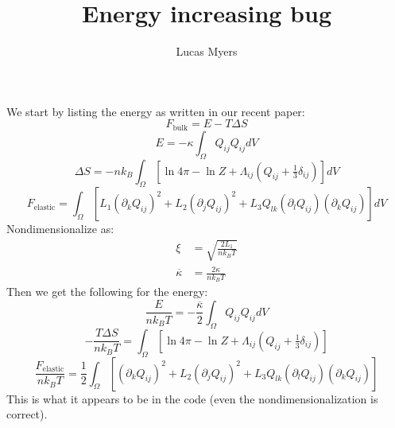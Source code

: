 \documentclass[reqno]{article}
\begin{document}
\title{Energy increasing bug}
\author{Lucas Myers}
\maketitle

We start by listing the energy as written in our recent paper:
\begin{equation}
    F_\text{bulk}
    =
    E
    - T \Delta S
\end{equation}
\begin{equation}
    E = -\kappa \int_\Omega Q_{ij} Q_{ij} dV
\end{equation}
\begin{equation}
    \Delta S
    =
    -n k_B \int_\Omega \left[ \ln 4 \pi - \ln Z + \Lambda_{ij} \left( Q_{ij} + \tfrac13 \delta_{ij} \right) \right] dV
\end{equation}
\begin{equation}
    F_\text{elastic}
    =
    \int_\Omega
    \left[
        L_1 \left( \partial_k Q_{ij} \right)^2
        + L_2 \left( \partial_j Q_{ij} \right)^2
        + L_3 Q_{lk} \left( \partial_l Q_{ij} \right) \left( \partial_k Q_{ij} \right)
    \right]
    dV
\end{equation}
Nondimensionalize as:
\begin{equation}
\begin{split}
    \xi
    &=
    \sqrt{\frac{2 L_1}{n k_B T}} \\
    \overline{\kappa}
    &=
    \frac{2 \kappa}{n k_B T}
\end{split}
\end{equation}
Then we get the following for the energy:
\begin{equation}
    \frac{E}{n k_B T}
    =
    - \frac{\overline{\kappa}}{2} \int_\Omega Q_{ij} Q_{ij} dV
\end{equation}
\begin{equation}
    -\frac{T \Delta S}{n k_B T}
    =
    \int_\Omega \left[ \ln 4 \pi - \ln Z + \Lambda_{ij} \left( Q_{ij} + \tfrac13 \delta_{ij} \right) \right]
\end{equation}
\begin{equation}
    \frac{F_\text{elastic}}{n k_B T}
    =
    \frac12 \int_\Omega \left[
        \left( \partial_k Q_{ij} \right)^2
        + L_2 \left( \partial_j Q_{ij} \right)^2
        + L_3 Q_{lk} \left( \partial_l Q_{ij} \right) \left( \partial_k Q_{ij} \right)
    \right]
\end{equation}
This is what it appears to be in the code (even the nondimensionalization is correct).
\end{document}
